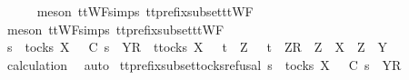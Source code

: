 \begin{isabellebody}
\ \ \ \ \isamarkupfalse%
\ {\isacharparenleft}meson\ ttWF{\isachardot}simps{\isacharparenleft}{}{\isacharparenright}\ tt{\isacharunderscore}prefix{\isacharunderscore}subset{\isacharunderscore}ttWF{\isacharparenright}\isanewline
\ \ \ \ \isamarkupfalse%
\ {\isacharparenleft}meson\ ttWF{\isachardot}simps{\isacharparenleft}{}{\isacharparenright}\ tt{\isacharunderscore}prefix{\isacharunderscore}subset{\isacharunderscore}ttWF{\isacharparenright}\isanewline
\ \ \isamarkupfalse%
\ \isamarkupfalse%
\ {\isachardoublequoteopen}s\ {\isasymin}\ tocks\ X\ {\isasymLongrightarrow}\ {\isasymrho}\ {\isasymlesssim}\isactrlsub C\ s\ {\isacharat}\ {\isacharbrackleft}{\isacharbrackleft}Y{\isacharbrackright}\isactrlsub R{\isacharbrackright}\ {\isasymLongrightarrow}\ {\isasymexists}t{\isasymin}tocks\ X{\isachardot}\ {\isasymrho}\ {\isacharequal}\ t\ {\isasymor}\ {\isacharparenleft}{\isasymexists}Z{\isachardot}\ {\isasymrho}\ {\isacharequal}\ t\ {\isacharat}\ {\isacharbrackleft}{\isacharbrackleft}Z{\isacharbrackright}\isactrlsub R{\isacharbrackright}\ {\isasymand}\ {\isacharparenleft}Z\ {\isasymsubseteq}\ X\ {\isasymor}\ Z\ {\isasymsubseteq}\ Y{\isacharparenright}{\isacharparenright}{\isachardoublequoteclose}\isanewline
\ \ \ \ \isamarkupfalse%
\ calculation\ \isamarkupfalse%
\ auto\isanewline
{}\isamarkupfalse%
%
\endisatagproof
{\isafoldproof}%
%
\isadelimproof
\isanewline
%
\endisadelimproof
\isanewline
{}\isamarkupfalse%
\ tt{\isacharunderscore}prefix{\isacharunderscore}subset{\isacharunderscore}tocks{\isacharunderscore}refusal{}{\isacharcolon}\ {\isachardoublequoteopen}s\ {\isasymin}\ tocks\ X\ {\isasymLongrightarrow}\ {\isasymrho}\ {\isasymlesssim}\isactrlsub C\ s\ {\isacharat}\ {\isacharbrackleft}{\isacharbrackleft}Y{\isacharbrackright}\isactrlsub R{\isacharbrackright}\ {\isasymLongrightarrow}\isanewline

\end{isabellebody}
